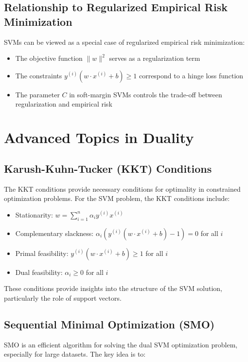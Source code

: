 \documentclass{article}
\begin{document}
\subsection{Relationship to Regularized Empirical Risk Minimization}
SVMs can be viewed as a special case of regularized empirical risk minimization:

\begin{itemize}
    \item The objective function $\|w\|^2$ serves as a regularization term
    \item The constraints $y^{(i)}(w \cdot x^{(i)} + b) \geq 1$ correspond to a hinge loss function
    \item The parameter $C$ in soft-margin SVMs controls the trade-off between regularization and empirical risk
\end{itemize}

\section{Advanced Topics in Duality}

\subsection{Karush-Kuhn-Tucker (KKT) Conditions}
The KKT conditions provide necessary conditions for optimality in constrained optimization problems. For the SVM problem, the KKT conditions include:

\begin{itemize}
    \item Stationarity: $w = \sum_{i=1}^{n} \alpha_i y^{(i)} x^{(i)}$
    \item Complementary slackness: $\alpha_i (y^{(i)}(w \cdot x^{(i)} + b) - 1) = 0$ for all $i$
    \item Primal feasibility: $y^{(i)}(w \cdot x^{(i)} + b) \geq 1$ for all $i$
    \item Dual feasibility: $\alpha_i \geq 0$ for all $i$
\end{itemize}

These conditions provide insights into the structure of the SVM solution, particularly the role of support vectors.

\subsection{Sequential Minimal Optimization (SMO)}
SMO is an efficient algorithm for solving the dual SVM optimization problem, especially for large datasets. The key idea is to:
\end{document}
